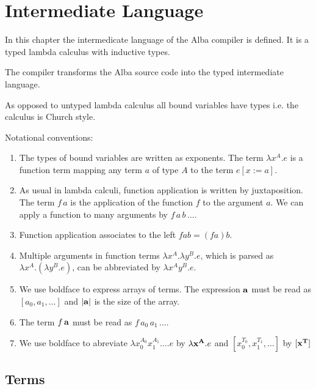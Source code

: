 \section{Intermediate Language}
\label{sec:lang-intermediate-language}

In this chapter the intermedicate language of the Alba compiler is defined. It
is a typed lambda calculus with inductive types.

The compiler transforms the Alba source code into the typed intermediate
language.

As opposed to untyped lambda calculus all bound variables have types i.e. the
calculus is Church style.

Notational conventions:
\begin{enumerate}
\item The types of bound variables are written as exponents. The term
  $\lambda x^A. e$ is a function term mapping any term $a$ of type $A$ to the
  term $e[x:=a]$.

\item As usual in lambda calculi, function application is written by
  juxtaposition. The term $f\,a$ is the application of the function $f$ to the
  argument $a$. We can apply a function to many arguments by $f \, a \, b \,
  \ldots$.

\item Function application associates to the left $f a b = (f a) b$.

\item Multiple arguments in function terms $\lambda x^A. \lambda y^B . e$,
  which is parsed as $\lambda x^A. (\lambda y^B . e)$, can be abbreviated by
  $\lambda x^A y^B. e$.

\item We use boldface to express arrays of terms. The expression $\mathbf{a}$ must
  be read as $[a_0, a_1, \ldots]$ and $|\mathbf{a}|$ is the size of the array.

\item The term $f \, \mathbf{a}$ must be read as $f \, a_0 \, a_1 \, \ldots$.

\item We use boldface to abreviate $\lambda x_0^{A_0} x_1^{A_1} \ldots . e$ by
  $\lambda \mathbf{x}^{\mathbf{A}}. e$ and $[x_0^{T_0}, x_1^{T_1}, \ldots]$ by
  $[\mathbf{x}^{\mathbf{T}}]$
\end{enumerate}







\subsection{Terms}
\label{sec:terms}


